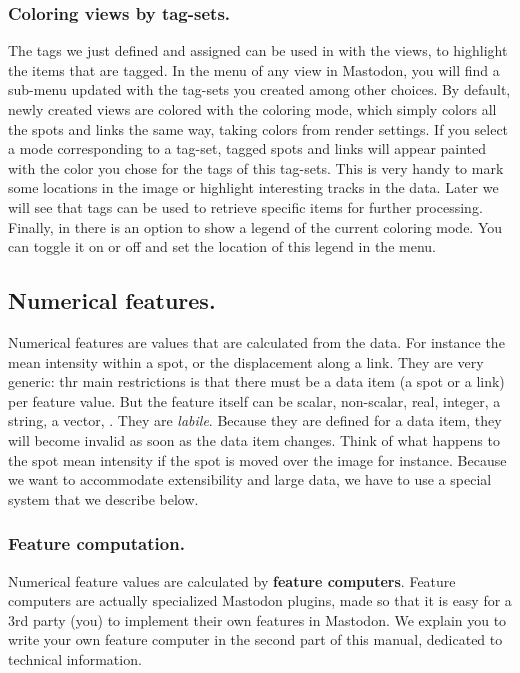 \subsubsection{Coloring views by tag-sets.}

The tags we just defined and assigned can be used in with the views, to highlight the items that are tagged. 
In the  menu of any view in Mastodon, you will find a sub-menu updated with the tag-sets you created among other choices. 
By default, newly created views are colored with the  coloring mode, which simply colors all the spots and links the same way, taking colors from render settings. 
If you select a mode corresponding to a tag-set, tagged spots and links will appear painted with the color you chose for the tags of this tag-sets.
This is very handy to mark some locations in the image or highlight interesting tracks in the data.
Later we will see that tags can be used to retrieve specific items for further processing.
Finally, in \TrackScheme there is an option to show a legend of the current coloring mode.
You can toggle it on or off and set the location of this legend in the  menu.




\subsection{Numerical features.}

Numerical features are values that are calculated from the data.
For instance the mean intensity within a spot, or the displacement along a link.
They are very generic: thr main restrictions is that there must be a data item (a spot or a link) per feature value. 
But the feature itself can be scalar, non-scalar, real, integer, a string, a vector, 
\etc.
They are \textit{labile}. 
Because they are defined for a data item, they will become invalid as soon as the data item changes.
Think of what happens to the spot mean intensity if the spot is moved over the image for instance.
Because we want to accommodate extensibility and large data, we have to use a special system that we describe below. 

\subsubsection{Feature computation.}

Numerical feature values are calculated by \textbf{feature computers}.
Feature computers are actually specialized Mastodon plugins, made so that it is easy for a 3rd party (you) to implement their own features in Mastodon.
We explain you to write your own feature computer in the second part of this manual, dedicated to technical information.


